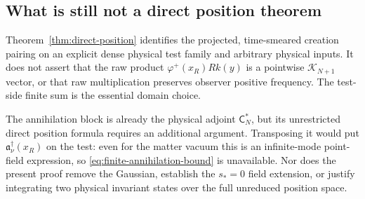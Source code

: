 \subsection{What is still not a direct position theorem}
Theorem~\ref{thm:direct-position} identifies the projected, time-smeared
creation pairing on an explicit dense physical test family and arbitrary
physical inputs. It does not assert that the raw product
$\varphi^+(x_R)Rk(y)$ is a pointwise $\mathcal K_{N+1}$ vector,
or that raw multiplication preserves observer positive frequency.
The test-side finite sum is the essential domain choice.

The annihilation block is already the physical adjoint
$\mathsf C_N^*$, but its unrestricted direct position formula requires
an additional argument. Transposing it would put
$\mathfrak a_\nu^\dagger(x_R)$ on the test: even for the matter vacuum
this is an infinite-mode point-field expression, so
\eqref{eq:finite-annihilation-bound} is unavailable.
Nor does the present proof remove the Gaussian, establish the
$s_*=0$ field extension, or justify integrating two physical invariant
states over the full unreduced position space.
